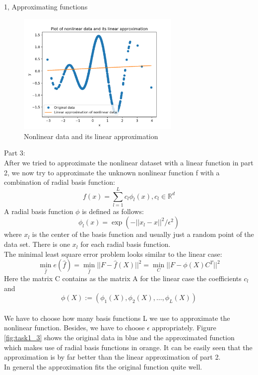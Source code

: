 \documentclass[10pt,a4paper]{article}
\begin{document}
\begin{task}{1, Approximating functions}
\begin{figure}[H]
\centering
\includegraphics[width=0.7\textwidth]{../plots/task1_part2.png}
\caption{Nonlinear data and its linear approximation}
\label{fig:task1_2}
\end{figure}
Part 3: \\
After we tried to approximate the nonlinear dataset with a linear function in part 2, we now try to approximate the unknown nonlinear function f with a combination of radial basis function:
\begin{equation*}
	f(x)=\sum_{l=1}^Lc_l\phi_l(x), c_l \in \mathbb{R}^d
\end{equation*}
A radial basis function $\phi$ is defined as follows:
\begin{equation*}
	\phi_l(x) = \exp(-||x_l -x||^2/\epsilon^2)
\end{equation*}
where $x_l$ is the center of the basis function and usually just a random point of the data set. There is one $x_l$ for each radial basis function. \\
The minimal least square error problem looks similar to the linear case:
\begin{equation*}
\min_{\hat{f}} e(\hat{f}) =  \min_{\hat{f}} ||F-\hat{f}(X)||^2  =\min_C||F-\phi(X)C^T||^2
\end{equation*}
Here the matrix C contains as the matrix A for the linear case the coefficients $c_l$ and 
\begin{equation*}
\phi(X):= (\phi_1(X),\phi_2(X), \dots, \phi_L(X))
\end{equation*}
\\ We have to choose how many basis functions L  we use to approximate the nonlinear function. Besides, we have to choose $\epsilon$ appropriately.
Figure \ref{fig:task1_3} shows the original data in blue and the approximated function which makes use of radial basis functions in orange. It can be easily seen that the approximation is by far better than the linear approximation of part 2. \\ In general the approximation fits the original function quite well.

\end{task}
\end{document}
